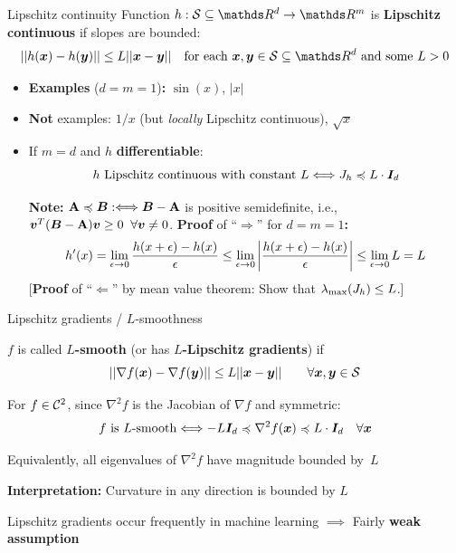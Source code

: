 \documentclass[11pt,compress,t,notes=noshow, xcolor=table]{beamer}
\begin{document}
\begin{framev}[fs=footnotesize]{Lipschitz continuity}
Function $h : \S\subseteq \R^d \to \R^m$ is \textbf{Lipschitz continuous} if slopes are bounded:
$$
||h(\xv) - h(\yv)|| \leq L ||\xv - \yv|| \quad \text{for each $\xv,\yv\in\S\subseteq \R^d$ and some~$L>0$}
$$
\begin{itemize}
\item \textbf{Examples} ($d=m=1$)\textbf{:} $\sin(x)$, $|x|$
\item \textbf{Not} examples: $1/x$ (but \textit{locally} Lipschitz continuous), $\sqrt{x}$
\item If $m=d$ and $h$ \textbf{differentiable}:
$$
\text{$h$ Lipschitz continuous with constant $L$} \Longleftrightarrow J_h \preccurlyeq L \cdot \bm{I}_d
$$
\begin{footnotesize}
\textbf{Note:} $\mathbf{A} \preccurlyeq \bm{B} :\Longleftrightarrow \bm{B} - \mathbf{A}$ is positive semidefinite, i.e., $\bm{v}^T(\bm{B} - \mathbf{A})\bm{v} \geq 0 \;\; \forall \bm{v} \neq 0$.
\spacer
\textbf{Proof} of ``$\Rightarrow$'' for $d=m=1$\textbf{:}
$$
h'(x) = \lim_{\epsilon\to0} \frac{h(x+\epsilon)-h(x)}{\epsilon} \leq \lim_{\epsilon\to0}\left|\frac{h(x+\epsilon)-h(x)}{\epsilon}\right| \leq \lim_{\epsilon\to0}L = L
$$
[\textbf{Proof} of ``$\Leftarrow$'' by mean value theorem: Show that $\lambda_\text{max}(J_h) \leq L$.]
\end{footnotesize}
\end{itemize}
\end{framev}


\begin{framei}{Lipschitz gradients / $L$-smoothness}
\item $f$ is called \textbf{$L$-smooth} (or has \textbf{$L$-Lipschitz gradients}) if
$$
||\nabla f(\bm{x}) - \nabla f(\bm{y})|| \leq L ||\bm{x} - \bm{y}|| \qquad \forall \bm{x}, \bm{y} \in \mathcal{S}
$$
\item For $f\in\mathcal{C}^{2}$, since $\nabla^2 f$ is the Jacobian of $\nabla f$ and symmetric:
$$
\text{$f$ is $L$-smooth} \Longleftrightarrow -L \bm{I}_d \preccurlyeq \nabla^2 f(\bm{x}) \preccurlyeq L \cdot \bm{I}_d \quad \forall \bm{x}
$$
\item Equivalently, all eigenvalues of $\nabla^2 f$ have magnitude bounded by~$L$
\item \textbf{Interpretation:} Curvature in any direction is bounded by $L$
\item Lipschitz gradients occur frequently in machine learning
$\implies$ Fairly \textbf{weak assumption}
\end{framei}
\end{document}
